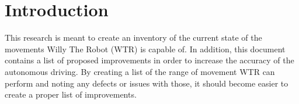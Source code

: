 \section{Introduction}
This research is meant to create an inventory of the current state of the movements Willy The Robot (WTR) is capable of.
In addition, this document contains a list of proposed improvements in order to increase the accuracy of the autonomous driving.
By creating a list of the range of movement WTR can perform and noting any defects or issues with those, it should become easier to create a proper list of improvements.

\newpage
